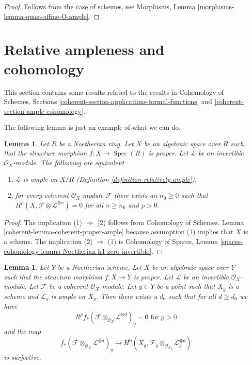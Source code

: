 \documentclass{stacks-project}
\theoremstyle{plain}
\newtheorem{lemma}[subsection]{Lemma}
\theoremstyle{definition}
\theoremstyle{remark}
\numberwithin{equation}{subsection}
\def\Spec{\mathop{\mathrm{Spec}}}
\begin{document}
\begin{proof}
Follows from the case of schemes, see
Morphisms, Lemma \ref{morphisms-lemma-quasi-affine-O-ample}.
\end{proof}



\section{Relative ampleness and cohomology}
\label{section-ample-and-proper}

\noindent
This section contains some results related to the results
in Cohomology of Schemes, Sections
\ref{coherent-section-applications-formal-functions} and
\ref{coherent-section-ample-cohomology}.

\medskip\noindent
The following lemma is just an example of what we can do.

\begin{lemma}
\label{lemma-vanshing-gives-ample}
Let $R$ be a Noetherian ring. Let $X$ be an algebraic space over $R$
such that the structure morphism $f : X \to \Spec(R)$ is proper.
Let $\mathcal{L}$ be an invertible $\mathcal{O}_X$-module.
The following are equivalent
\begin{enumerate}
\item $\mathcal{L}$ is ample on $X/R$
(Definition \ref{definition-relatively-ample}),
\item for every coherent $\mathcal{O}_X$-module $\mathcal{F}$
there exists an $n_0 \geq 0$ such that
$H^p(X, \mathcal{F} \otimes \mathcal{L}^{\otimes n}) = 0$
for all $n \geq n_0$ and $p > 0$.
\end{enumerate}
\end{lemma}

\begin{proof}
The implication (1) $\Rightarrow$ (2) follows from
Cohomology of Schemes, Lemma \ref{coherent-lemma-coherent-proper-ample}
because assumption (1) implies that $X$ is a scheme.
The implication (2) $\Rightarrow$ (1) is
Cohomology of Spaces, Lemma
\ref{spaces-cohomology-lemma-Noetherian-h1-zero-invertible}.
\end{proof}

\begin{lemma}
\label{lemma-ample-on-fibre}
Let $Y$ be a Noetherian scheme. Let $X$ be an algebraic space over $Y$
such that the structure morphism $f : X \to Y$ is proper.
Let $\mathcal{L}$ be an invertible $\mathcal{O}_X$-module.
Let $\mathcal{F}$ be a coherent $\mathcal{O}_X$-module.
Let $y \in Y$ be a point such that $X_y$ is a scheme and
$\mathcal{L}_y$ is ample on $X_y$.
Then there exists a $d_0$ such that for all $d \geq d_0$ we have
$$
R^pf_*(\mathcal{F} \otimes_{\mathcal{O}_X} \mathcal{L}^{\otimes d})_y = 0
\text{ for }p > 0
$$
and the map
$$
f_*(\mathcal{F} \otimes_{\mathcal{O}_X} \mathcal{L}^{\otimes d})_y
\longrightarrow
H^0(X_y, \mathcal{F}_y \otimes_{\mathcal{O}_{X_y}} \mathcal{L}_y^{\otimes d})
$$
is surjective.
\end{lemma}
\end{document}
